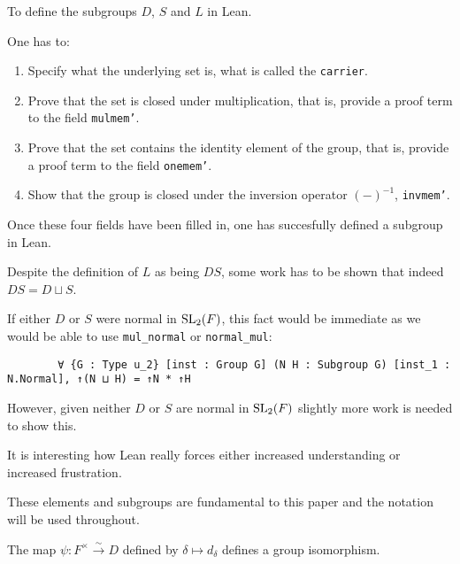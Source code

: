 \begin{remark}
    To define the subgroups $D$, $S$ and $L$ in Lean. 
    
    One has to:
    
    \begin{enumerate}
        \item Specify what the underlying set is, what is called the \texttt{carrier}.
        \item Prove that the set is closed under multiplication, that is, provide a proof term to the field \texttt{mul\textunderscore mem'}.
        \item Prove that the set contains the identity element of the group, that is, provide a proof term to the field \texttt{one\textunderscore mem'}.
        \item Show that the group is closed under the inversion operator $(-)^{-1}$, \texttt{inv\textunderscore mem'}.
    \end{enumerate}

    Once these four fields have been filled in, one has succesfully defined a subgroup in Lean.
\end{remark}


\begin{remark}
    Despite the definition of $L$ as being $D S$, some work has to be shown that indeed $DS = D \sqcup S$.
    
    If either $D$ or $S$ were normal in $\operatorname{SL}_2(F)$, this fact would be immediate as we would be able to use \texttt{mul\_normal} or \texttt{normal\_mul}:
    
    \begin{footnotesize}
      \begin{verbatim}
        ∀ {G : Type u_2} [inst : Group G] (N H : Subgroup G) [inst_1 : N.Normal], ↑(N ⊔ H) = ↑N * ↑H
    \end{verbatim}
    \end{footnotesize}
    

    However, given neither $D$ or $S$ are normal in $\operatorname{SL}_2(F)$ slightly more work is needed to show this.
    
    It is interesting how Lean really forces either increased understanding or increased frustration.
\end{remark}

These elements and subgroups are fundamental to this paper and the notation will be used throughout.

\begin{definition}
\label{SpecialSubgroups.D_iso_units}
\leanok
The map $\psi : F^\times \overset{\sim}{\rightarrow} D$ defined by $\delta \mapsto d_\delta$ defines a group isomorphism.
\end{definition}

